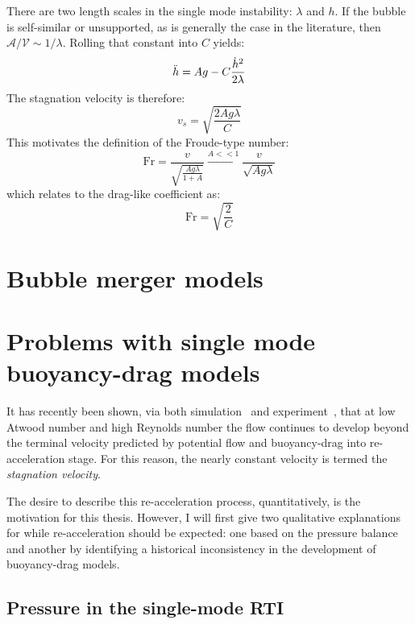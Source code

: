 There are two length scales in the single mode instability: $\lambda$ and $h$.
If the bubble is self-similar or unsupported, as is generally the case in the literature, then $\mathcal{A}/\mathcal{V} \sim 1/\lambda$.
Rolling that constant into $C$ yields:
\begin{equation} \elabel{bouancy_drag}
\ddot{h} = A g - C \frac{\dot{h}^2}{2 \lambda}  
\end{equation}
The stagnation velocity is therefore:
\begin{equation}
v_s = \sqrt{\frac{2 A g \lambda}{C}}
\end{equation}
This motivates the definition of the Froude-type number:
\begin{equation}
\text{Fr} = \frac{v}{\sqrt{\frac{A g \lambda}{1+A}}} \xrightarrow{A << 1} \frac{v}{\sqrt{A g \lambda}}
\end{equation}
which relates to the drag-like coefficient as:
\begin{equation}
\text{Fr} = \sqrt{\frac{2}{C}}
\end{equation}

\section{Bubble merger models}

\section{Problems with single mode buoyancy-drag models}

It has recently been shown, via both simulation~\cite{Ramaprabhu2006} and experiment~\cite{Wilkinson2007}, that at low Atwood number and high Reynolds number the flow continues to develop beyond the terminal velocity predicted by potential flow and buoyancy-drag into re-acceleration stage.
For this reason, the nearly constant velocity is termed the \textit{stagnation velocity}.

The desire to describe this re-acceleration process, quantitatively, is the motivation for this thesis.
However, I will first give two qualitative explanations for while re-acceleration should be expected: one based on the pressure balance and another by identifying a historical inconsistency in the development of buoyancy-drag models.

\subsection{Pressure in the single-mode RTI}

